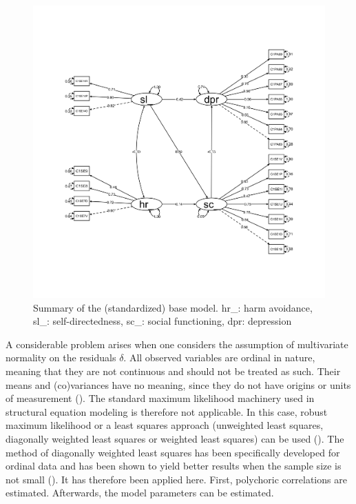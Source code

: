 \documentclass[11pt]{article}
\begin{document}
\begin{figure}[h!]
\centering
\includegraphics[width=14cm]{../visualizations/base_model.png}
\caption{Summary of the (standardized) base model. hr\_: harm avoidance,
         sl\_: self-directedness, sc\_: social functioning, dpr: depression}
\end{figure}

A considerable problem arises when one considers the assumption of multivariate
normality on the residuals $\delta$. All observed variables are ordinal in nature,
meaning that they are not continuous and should not be treated as such. Their
means and (co)variances have no meaning, since they do not have origins or units
of measurement (\cite{joreskog1994}). The standard maximum likelihood machinery
used in structural equation modeling is therefore not applicable. In this case,
robust maximum likelihood or a least squares approach (unweighted least squares,
diagonally weighted least squares or weighted least squares) can be used
(\cite{yangwallentin2010}). The method of diagonally weighted least squares has
been specifically developed for ordinal data and has been shown to yield better
results when the sample size is not small (\cite{li2016}). It has therefore been
applied here. First, polychoric correlations are estimated. Afterwards, the model
parameters can be estimated. 
\end{document}
